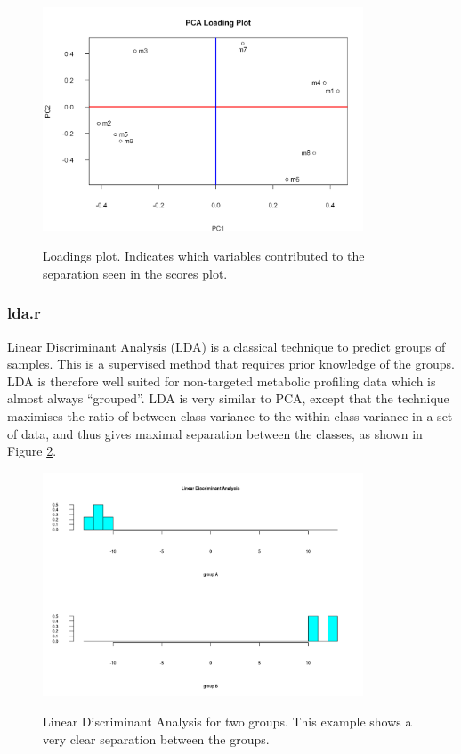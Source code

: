 \documentclass[english,a4paper,12pt]{article}
\begin{document}
\begin{figure}[!hp]
    \centering
    \includegraphics[width=0.85\textwidth]{images/PCA_loadings.png} \\
    \caption[PCA - Loadings]{Loadings plot. Indicates which variables contributed to the separation seen in the scores plot.}
    \label{fig:PCA_loadings}
\end{figure}

\subsubsection*{lda.r}
Linear Discriminant Analysis (LDA) is a classical technique to predict groups of samples. This is a supervised method that requires prior knowledge of the groups. LDA is therefore well suited for non-targeted metabolic profiling data which is almost always ``grouped''. LDA is very similar to PCA, except that the technique maximises the ratio of between-class variance to the within-class variance in a set of data, and thus gives maximal separation between the classes, as shown in Figure \ref{fig:LDA}.

\begin{figure}[!h!tb]
    \centering
    \includegraphics[width=0.85\textwidth]{images/LDA.png} \\
    \caption[Linear Discriminant Analysis]{Linear Discriminant Analysis for two groups. This example shows a very clear separation between the groups.}
    \label{fig:LDA}
\end{figure}
\end{document}
